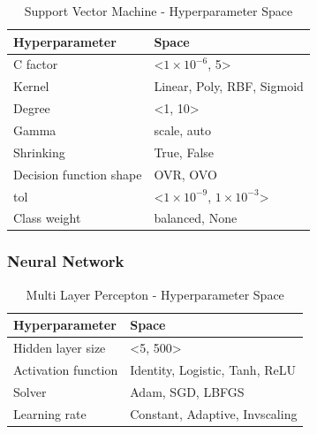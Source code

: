 \begin{table}[H]
    \small
    \setlength{\tabcolsep}{8pt}
    \renewcommand{\arraystretch}{1.3}
    \centering
        \caption[Support Vector Machine - Hyperparameter Space]{Support Vector Machine - Hyperparameter Space}\label{tab:svmspace}
        \begin{tabular}{ll}
    \toprule
    \textbf{Hyperparameter} & \textbf{Space}\\
    \midrule
    \hline
    C factor & <$1\times 10^{-6}$, 5> \\
    Kernel & Linear, Poly, RBF, Sigmoid \\
    Degree & <1, 10> \\
    Gamma & scale, auto \\
    Shrinking & True, False \\
    Decision function shape & OVR, OVO \\
    tol & <$1\times 10^{-9}$, $1\times 10^{-3}$> \\
    Class weight & balanced, None \\
    \hline
    \bottomrule
    \end{tabular}
    \vspace{0.7em}

    \vspace{-1em}
\end{table}


\subsubsection{Neural Network}

\begin{table}[H]
    \small
    \setlength{\tabcolsep}{8pt}
    \renewcommand{\arraystretch}{1.3}
    \centering
        \caption[Multi Layer Percepton - Hyperparameter Space]{Multi Layer Percepton - Hyperparameter Space}\label{tab:mlpspace}
        \begin{tabular}{ll}
    \toprule
    \textbf{Hyperparameter} & \textbf{Space}\\
    \midrule
    \hline
    Hidden layer size & <5, 500> \\
    Activation function & Identity, Logistic, Tanh, ReLU \\
    Solver & Adam, SGD, LBFGS \\
    Learning rate & Constant, Adaptive, Invscaling \\
    \hline
    \bottomrule
    \end{tabular}
    \vspace{0.7em}

    \vspace{-1em}
\end{table}



